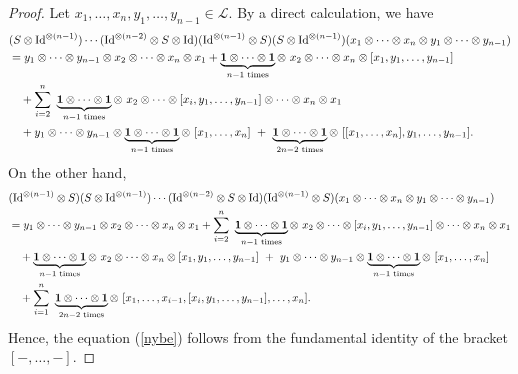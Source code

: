\documentclass[a4paper,reqno,10pt]{amsart}
\theoremstyle{plain}
\theoremstyle{definition}
\theoremstyle{remark}
\begin{document}
\begin{proof}
Let $x_1, \ldots, x_n, y_1, \ldots, y_{n-1} \in \mathcal{L}$. By a direct calculation, we have
    \begin{align*}
        &(S \otimes \mathrm{Id}^{\otimes (n-1)}) \cdots (\mathrm{Id}^{\otimes (n-2)} \otimes S \otimes \mathrm{Id})  (\mathrm{Id}^{\otimes (n-1)} \otimes S) (S \otimes \mathrm{Id}^{\otimes (n-1)}) (x_1 \otimes \cdots \otimes x_n \otimes y_1 \otimes \cdots \otimes y_{n-1}) \\
        &= y_1 \otimes \cdots \otimes y_{n-1} \otimes x_2 \otimes \cdots \otimes x_n \otimes x_1 + \underbrace{{\bf 1} \otimes \cdots \otimes {\bf 1}}_{n-1 \text{ times}}  \otimes ~ { x_2} \otimes \cdots \otimes x_n \otimes [x_1, y_1, \ldots, y_{n-1}] \\
        & \quad + \sum_{i=2}^n ~\underbrace{{\bf 1} \otimes \cdots \otimes {\bf 1}}_{n-1 \text{ times}} \otimes ~ x_2 \otimes \cdots \otimes [x_i, y_1, \ldots, y_{n-1}] \otimes \cdots \otimes x_n \otimes x_1 \\
        & \quad + y_1 \otimes \cdots \otimes y_{n-1} \otimes \underbrace{{\bf 1} \otimes \cdots \otimes {\bf 1}}_{n-1 \text{ times}} \otimes ~ [x_1, \ldots, x_n ]  ~+~ \underbrace{{\bf 1} \otimes \cdots \otimes {\bf 1}}_{2n-2 \text{ times}} \otimes ~[[x_1, \ldots, x_n], y_1, \ldots, y_{n-1}].
    \end{align*}
    On the other hand, 
    \begin{align*}
       &(\mathrm{Id}^{\otimes (n-1)} \otimes S)  (S \otimes \mathrm{Id}^{\otimes (n-1)}) \cdots (\mathrm{Id}^{\otimes (n-2)} \otimes S \otimes \mathrm{Id})  (\mathrm{Id}^{\otimes (n-1)} \otimes S)  (x_1 \otimes \cdots \otimes x_n \otimes y_1 \otimes \cdots \otimes y_{n-1}) \\
       &= y_1 \otimes \cdots \otimes y_{n-1} \otimes x_2 \otimes \cdots \otimes x_n \otimes x_1   + \sum_{i=2}^n ~\underbrace{{\bf 1} \otimes \cdots \otimes {\bf 1}}_{n-1 \text{ times}} \otimes ~ x_2 \otimes \cdots \otimes [x_i, y_1, \ldots, y_{n-1}] \otimes \cdots \otimes x_n \otimes x_1 \\
      & \quad + \underbrace{{\bf 1} \otimes \cdots \otimes {\bf 1}}_{n-1 \text{ times}}  \otimes ~ { x_2} \otimes \cdots \otimes x_n \otimes [x_1, y_1, \ldots, y_{n-1}]  ~+~ y_1 \otimes \cdots \otimes y_{n-1} \otimes \underbrace{{\bf 1} \otimes \cdots \otimes {\bf 1}}_{n-1 \text{ times}} \otimes ~ [x_1, \ldots, x_n ]  \\
      & \quad + \sum_{i=1}^n ~ \underbrace{{\bf 1} \otimes \cdots \otimes {\bf 1}}_{2n-2 \text{ times}} \otimes ~[x_1, \ldots, x_{i-1}, [x_i, y_1, \ldots, y_{n-1}], \ldots, x_n].
    \end{align*}
    Hence, the equation (\ref{nybe}) follows from the fundamental identity of the bracket $[-, \ldots, - ]$.


\end{proof}
\end{document}

